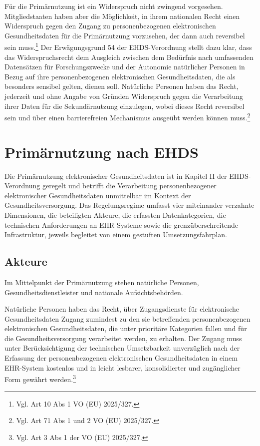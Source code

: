 Für die Primärnutzung ist ein Widerspruch nicht zwingend vorgesehen. Mitgliedstaaten haben aber die Möglichkeit, in ihrem nationalen Recht einen Widerspruch gegen den Zugang zu personenbezogenen elektronischen Gesundheitsdaten für die Primärnutzung vorzusehen, der dann auch reversibel sein muss.\footnote{Vgl. Art 10 Abs 1 VO (EU) 2025/327.}
Der Erwägungsgrund 54 der EHDS-Verordnung stellt dazu klar, dass das Widerspruchsrecht dem Ausgleich zwischen dem Bedürfnis nach umfassenden Datensätzen für Forschungszwecke und der Autonomie natürlicher Personen in Bezug auf ihre personenbezogenen elektronischen Gesundheitsdaten, die als besonders sensibel gelten, dienen soll. Natürliche Personen haben das Recht, jederzeit und ohne Angabe von Gründen Widerspruch gegen die Verarbeitung ihrer Daten für die Sekundärnutzung einzulegen, wobei dieses Recht reversibel sein und über einen barrierefreien Mechanismus ausgeübt werden können muss.\footnote{Vgl. Art 71 Abs 1 und 2 VO (EU) 2025/327.}


\section{Primärnutzung nach EHDS}
Die Primärnutzung elektronischer Gesundheitsdaten ist in Kapitel II der EHDS-Verordnung geregelt und betrifft die Verarbeitung personenbezogener elektronischer Gesundheitsdaten unmittelbar im Kontext der Gesundheitsversorgung. Das Regelungsregime umfasst vier miteinander verzahnte Dimensionen, die beteiligten Akteure, die erfassten Datenkategorien, die technischen Anforderungen an EHR-Systeme sowie die grenzüberschreitende Infrastruktur, jeweils begleitet von einem gestuften Umsetzungsfahrplan.

    \subsection{Akteure}
Im Mittelpunkt der Primärnutzung stehen natürliche Personen, Gesundheitsdienstleister und nationale Aufsichtsbehörden.

Natürliche Personen haben das Recht, über Zugangsdienste für elektronische Gesundheitsdaten Zugang zumindest zu den sie betreffenden personenbezogenen elektronischen Gesundheitsdaten, die unter prioritäre Kategorien fallen und für die Gesundheitsversorgung verarbeitet werden, zu erhalten. Der Zugang muss unter Berücksichtigung der technischen Umsetzbarkeit unverzüglich nach der Erfassung der personenbezogenen elektronischen Gesundheitsdaten in einem EHR-System kostenlos und in leicht lesbarer, konsolidierter und zugänglicher Form gewährt werden.\footnote{Vgl. Art 3 Abs 1 der VO (EU) 2025/327.}

